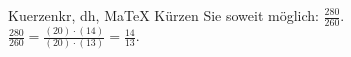 \begin{MAufgabe}{Kuerzen}{kr, dh, MaTeX}
K\"urzen Sie soweit m\"oglich: $\frac{280}{260}$.\\ 
\ifLsg\MLoesung
\quad $\frac{280}{260}=\frac{(20)\cdot(14)}{(20)\cdot(13)}=\frac{14}{13}$.\else\relax\fi
 \end{MAufgabe}